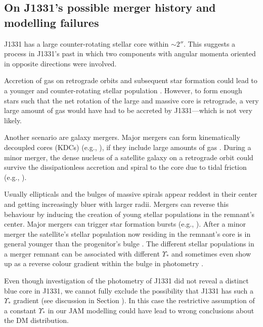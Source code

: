 \subsection{On J1331's possible merger history and modelling failures}

J1331 has a large counter-rotating stellar core within $\sim 2''$. This suggests a process in J1331's past in which two components with angular momenta oriented in opposite directions were involved.

Accretion of gas on retrograde orbits and subsequent star formation could lead to a younger and counter-rotating stellar population \Wilma{[TO DO: REF]}. However, to form enough stars such that the net rotation of the large and massive core is retrograde, a very large amount of gas would have had to be accreted by J1331---which is not very likely. 

Another scenario are galaxy mergers. Major mergers can form kinematically decoupled cores (KDCs) (e.g., \citealt{2011MNRAS.414.2923K,2015ApJ...802L...3T}), if they include large amounts of gas \citep{2010ApJ...723..818H}. During a minor merger, the dense nucleus of a satellite galaxy on a retrograde orbit could survive the dissipationless accretion and spiral to the core due to tidal friction (e.g., \citealt{1984ApJ...287..577K}). 

Usually ellipticals and the bulges of massive spirals appear reddest in their center and getting increasingly bluer with larger radii. Mergers can reverse this behaviour by inducing the creation of young stellar populations in the remnant's center. Major mergers can trigger star formation bursts (e.g., ). After a minor merger the satellite's stellar population now residing in the remnant's core is in general younger than the progenitor's bulge \Wilma{[TO DO: REF]} . The different stellar populations in a merger remnant can be associated with different $\Upsilon_*$ and sometimes even show up as a reverse colour gradient within the bulge in photometry \Wilma{[TO DO: REF]}.

Even though investigation of the photometry of J1331 did not reveal a distinct blue core in J1331, we cannot fully exclude the possibility that J1331 has such a $\Upsilon_*$ gradient (see discussion in Section  \Wilma{[TO DO: Where???]}). In this case the restrictive assumption of a constant $\Upsilon_*$ in our JAM modelling could have lead to wrong conclusions about the DM distribution.

